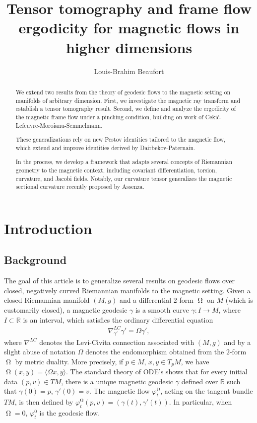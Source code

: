 \documentclass[12pt]{amsart}
\title[Magnetic flows in higher dimensions]{Tensor tomography and frame flow ergodicity for magnetic flows in higher dimensions}
\author{Louis-Brahim Beaufort}
\numberwithin{numbering}{section}
\theoremstyle{plain}
\theoremstyle{definition}
\theoremstyle{remark}
\numberwithin{equation}{section}
\DeclareMathOperator{\mg}{\Omega}
\newcommand{\R}{\mathbb{R}}
\begin{document}
\begin{abstract}
We extend two results from the theory of geodesic flows to the magnetic setting on manifolds of arbitrary dimension. First, we investigate the magnetic ray transform and establish a tensor tomography result. Second, we define and analyze the ergodicity of the magnetic frame flow under a pinching condition, building on work of Ceki\'{c}-Lefeuvre-Moroianu-Semmelmann.

These generalizations rely on new Pestov identities tailored to the magnetic flow, which extend and improve identities derived by Dairbekov-Paternain. 

In the process, we develop a framework that adapts several concepts of Riemannian geometry to the magnetic context, including covariant differentiation, torsion, curvature, and Jacobi fields. Notably, our curvature tensor generalizes the magnetic sectional curvature recently proposed by Assenza.
\end{abstract}

\maketitle


\section{Introduction} \label{sec:intro}

\subsection{Background}

The goal of this article is to generalize several results on geodesic flows over closed, negatively curved Riemannian manifolds to the magnetic setting. Given a closed Riemannian manifold $(M, g)$ and a differential $2$-form $\mg$ on $M$ (which is customarily closed), a magnetic geodesic $\gamma$ is a smooth curve $\gamma: I \to M$, where $I \subset \R$ is an interval, which satisfies the ordinary differential equation 
\begin{align*}
\nabla_{\gamma'}^{LC} \gamma' = \Omega \gamma',
\end{align*}
where $\nabla^{LC}$ denotes the Levi-Civita connection associated with $(M, g)$ and by a slight abuse of notation $\Omega$ denotes the endomorphism obtained from the $2$-form $\mg$ by metric duality. More precisely, if $p \in M$, $x, y \in T_p M$, we have $\mg(x, y) = \langle \Omega x, y \rangle$. The standard theory of ODE's shows that for every initial data $(p, v) \in TM$, there is a unique magnetic geodesic $\gamma$ defined over $\R$ such that $\gamma(0) = p$, $\gamma'(0) = v$. The magnetic flow $\varphi_t^{\mg}$, acting on the tangent bundle $TM$, is then defined by $\varphi_t^{\mg}(p, v) = (\gamma(t), \gamma'(t))$. In particular, when $\mg = 0$, $\varphi_t^0$ is the geodesic flow.
\end{document}
